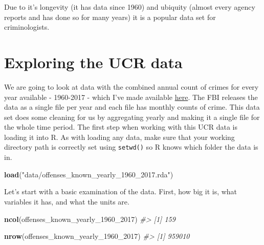 \documentclass[
  12pt,
]{book}
\newenvironment{Shaded}{\begin{snugshade}}{\end{snugshade}}
\newcommand{\CommentTok}[1]{\textcolor[rgb]{0.56,0.35,0.01}{\textit{#1}}}
\newcommand{\DecValTok}[1]{\textcolor[rgb]{0.00,0.00,0.81}{#1}}
\newcommand{\KeywordTok}[1]{\textcolor[rgb]{0.13,0.29,0.53}{\textbf{#1}}}
\newcommand{\NormalTok}[1]{#1}
\newcommand{\StringTok}[1]{\textcolor[rgb]{0.31,0.60,0.02}{#1}}
\begin{document}
Due to it's longevity (it has data since 1960) and ubiquity (almost every agency reports and has done so for many years) it is a popular data set for criminologists.

\hypertarget{exploring-the-ucr-data}{%
\section{Exploring the UCR data}\label{exploring-the-ucr-data}}

We are going to look at data with the combined annual count of crimes for every year available - 1960-2017 - which I've made available \href{http://doi.org/10.3886/E100707V11}{here}. The FBI releases the data as a single file per year and each file has monthly counts of crime. This data set does some cleaning for us by aggregating yearly and making it a single file for the whole time period. The first step when working with this UCR data is loading it into R. As with loading any data, make sure that your working directory path is correctly set using \texttt{setwd()} so R knows which folder the data is in.

\begin{Shaded}
\begin{Highlighting}[]
\KeywordTok{load}\NormalTok{(}\StringTok{"data/offenses\_known\_yearly\_1960\_2017.rda"}\NormalTok{)}
\end{Highlighting}
\end{Shaded}

Let's start with a basic examination of the data. First, how big it is, what variables it has, and what the units are.

\begin{Shaded}
\begin{Highlighting}[]
\KeywordTok{ncol}\NormalTok{(offenses\_known\_yearly\_}\DecValTok{1960}\NormalTok{\_}\DecValTok{2017}\NormalTok{)}
\CommentTok{\#> [1] 159}
\end{Highlighting}
\end{Shaded}

\begin{Shaded}
\begin{Highlighting}[]
\KeywordTok{nrow}\NormalTok{(offenses\_known\_yearly\_}\DecValTok{1960}\NormalTok{\_}\DecValTok{2017}\NormalTok{)}
\CommentTok{\#> [1] 959010}
\end{Highlighting}
\end{Shaded}
\end{document}
